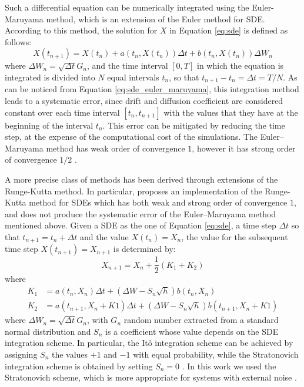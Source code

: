 \documentclass[a4paper, 12pt, twoside, openright]{book}
\begin{document}
Such a differential equation can be numerically integrated using the Euler-Maruyama method, which is an extension of the Euler method for SDE. According to this method, the solution for $X$ in Equation \eqref{eq:sde} is defined as follows:
\begin{equation}
    X(t_{n+1})= X(t_{n}) + a(t_n, X(t_{n}))\Delta t + b(t_n, X(t_{n})) \Delta W_{n}
    \label{eq:sde_euler_maruyama}
\end{equation}
where $\Delta W_{n} = \sqrt{\Delta t}G_n$, and the time interval $[0,T]$ in which the equation is integrated is divided into $N$ equal intervals $t_n$, so that $t_{n+1}-t_n = \Delta t = T/N$. As can be noticed from Equation \eqref{eq:sde_euler_maruyama}, this integration method leads to a systematic error, since drift and diffusion coefficient are considered constant over each time interval $[t_n, t_{n+1}]$ with the values that they have at the beginning of the interval $t_n$. This error can be mitigated by reducing the time step, at the expense of the computational cost of the simulations. The Euler–Maruyama method has weak order of convergence $1$, however it has strong order of convergence $1/2$ \cite{Machevicisu2011}.

A more precise class of methods has been derived through extensions of the Runge-Kutta method. In particular, \cite{Roberts2012} proposes an implementation of the Runge-Kutta method for SDEs which has both weak and strong order of convergence $1$, and does not produce the systematic error of the Euler–Maruyama method mentioned above. Given a SDE as the one of Equation \eqref{eq:sde}, a time step $\Delta t$ so that $t_{n+1} = t_{n} + \Delta t$ and the value $X(t_{n})=X_n$, the value for the subsequent time step $X(t_{n+1})=X_{n+1}$ is determined by:
\begin{equation}
    X_{n+1} = X_{n} + \frac{1}{2}(K_1 + K_2)
    \label{eq:sde_RK_1}
\end{equation}
where
\begin{equation}
\begin{split}
    K_{1} &=  a(t_n, X_n) \Delta t + (\Delta W - S_n \sqrt{h})b(t_n, X_n)\\
    K_{2} &=  a(t_{n+1}, X_{n} + K1) \Delta t + (\Delta W - S_n \sqrt{h})b(t_{n+1}, X_{n} + K1)
    \label{eq:sde_RK_2}
\end{split}
\end{equation}
where $\Delta W_n = \sqrt{\Delta t} G_n$, with $G_n$ random number extracted from a standard normal distribution  and $S_n$ is a coefficient whose value depends on the SDE integration scheme. In particular, the Itô integration scheme can be achieved by assigning $S_n$ the values $+1$ and $-1$ with equal probability, while the Stratonovich integration scheme is obtained by setting $S_n = 0$ \cite{Roberts2012}. In this work we used the Stratonovich scheme, which is more appropriate for systems with external noise \cite{vanKampen1981}.
\end{document}
